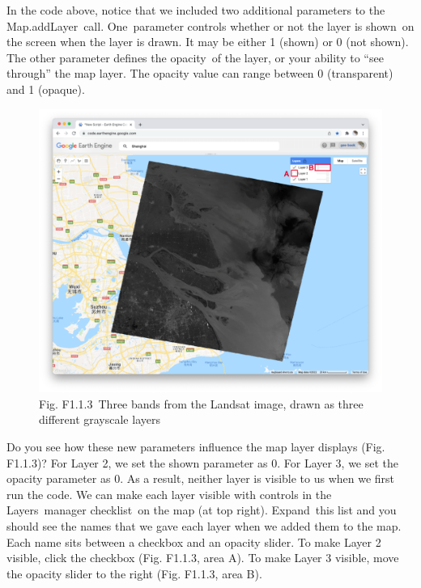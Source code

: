 \documentclass[
  letterpaper,
  DIV=11,
  numbers=noendperiod]{scrreprt}
\begin{document}
In the code above, notice that we included two additional parameters to
the Map.addLayer~call. One~parameter controls whether or not the layer
is shown~on the screen when the layer is drawn. It may be either 1
(shown) or 0 (not shown). The other parameter defines the opacity~of the
layer, or your ability to ``see through'' the map layer. The opacity
value can range between 0 (transparent) and 1 (opaque).

\begin{figure}

{\centering \includegraphics{./F1/image36.png}

}

\caption{Fig. F1.1.3~Three bands from the Landsat image, drawn as three
different grayscale layers}

\end{figure}

Do you see how these new parameters influence the map layer displays
(Fig. F1.1.3)? For Layer 2, we set the shown parameter as 0. For Layer
3, we set the opacity parameter as 0. As a result, neither layer is
visible to us when we first run the code. We can make each layer visible
with controls in the Layers~manager checklist~on the map (at top right).
Expand~this list and you should see the names that we gave each layer
when we added them to the map. Each name sits between a checkbox and an
opacity slider. To make Layer 2 visible, click the checkbox (Fig.
F1.1.3, area A). To make Layer 3 visible, move the opacity slider to the
right (Fig. F1.1.3, area B).
\end{document}
